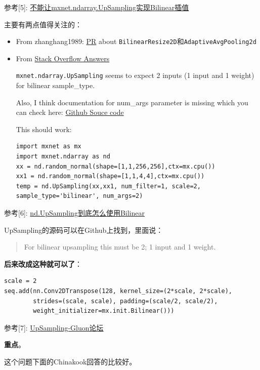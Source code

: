 参考[5]: \href{https://github.com/apache/incubator-mxnet/issues/9138}{不能让mxnet.ndarray.UpSampling实现Bilinear插值}

主要有两点值得关注的：
\begin{itemize}
\item From zhanghang1989: \href{https://github.com/apache/incubator-mxnet/pull/9688}{PR} about \verb|BilinearResize2D|和\verb|AdaptiveAvgPooling2d|
\item From \href{https://stackoverflow.com/questions/47897924/implementing-bilinear-interpolation-with-mxnet-ndarray-upsampling}{Stack Overflow Answers}

\verb|mxnet.ndarray.UpSampling| seems to expect 2 inputs (1 input and 1 weight) for bilinear sample\_type.

Also, I think documentation for num\_args parameter is missing which you can check here: \href{https://github.com/apache/incubator-mxnet/blob/master/src/operator/nn/upsampling-inl.h#L78}{Github Souce code}

This should work:

\begin{lstlisting}
import mxnet as mx
import mxnet.ndarray as nd
xx = nd.random_normal(shape=[1,1,256,256],ctx=mx.cpu())
xx1 = nd.random_normal(shape=[1,1,4,4],ctx=mx.cpu()) 
temp = nd.UpSampling(xx,xx1, num_filter=1, scale=2, sample_type='bilinear', num_args=2)
\end{lstlisting}

\end{itemize}

参考[6]: \href{https://discuss.gluon.ai/t/topic/2823}{nd.UpSampling到底怎么使用Bilinear}

UpSampling的源码可以在Github上找到，里面说：

\begin{quote}
For bilinear upsampling this must be 2; 1 input and 1 weight.
\end{quote}
\textbf{后来改成这种就可以了}：
\begin{lstlisting}
scale = 2
seq.add(nn.Conv2DTranspose(128, kernel_size=(2*scale, 2*scale), 
		strides=(scale, scale), padding=(scale/2, scale/2), 
		weight_initializer=mx.init.Bilinear()))
\end{lstlisting}

参考[7]: \href{https://discuss.gluon.ai/t/topic/2672}{UpSampling-Gluon论坛}

\textbf{重点}。

这个问题下面的Chinakook回答的比较好。

